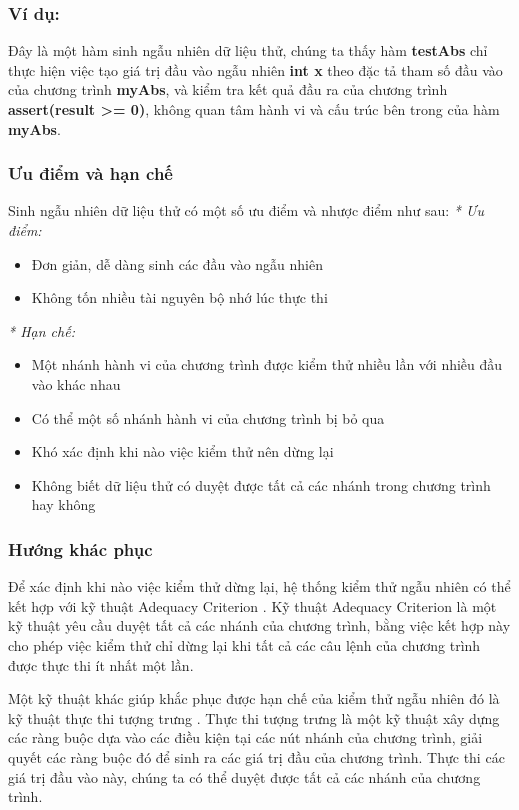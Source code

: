 \subsubsection*{Ví dụ:}

Đây là một hàm sinh ngẫu nhiên dữ liệu thử, chúng ta thấy hàm \textbf{testAbs} chỉ thực hiện việc tạo giá trị đầu vào ngẫu nhiên \textbf{int x} theo đặc tả tham số đầu vào của chương trình \textbf{myAbs}, và kiểm tra kết quả đầu ra của chương trình \textbf{assert(result >= 0)}, không quan tâm hành vi và cấu trúc bên trong của hàm \textbf{myAbs}.

\subsubsection*{Ưu điểm và hạn chế}
Sinh ngẫu nhiên dữ liệu thử có một số ưu điểm và nhược điểm như sau:
\textit{* Ưu điểm:}
\begin{itemize}
	\item Đơn giản, dễ dàng sinh các đầu vào ngẫu nhiên
	\item Không tốn nhiều tài nguyên bộ nhớ lúc thực thi
\end{itemize}

\textit{* Hạn chế:}
\begin{itemize}
	\item Một nhánh hành vi của chương trình được kiểm thử nhiều lần với nhiều đầu vào khác nhau
	\item Có thể một số nhánh hành vi của chương trình bị bỏ qua
	\item Khó xác định khi nào việc kiểm thử nên dừng lại
	\item Không biết dữ liệu thử có duyệt được tất cả các nhánh trong chương trình hay không
\end{itemize}

\subsubsection*{Hướng khác phục}
Để xác định khi nào việc kiểm thử dừng lại, hệ thống kiểm thử ngẫu nhiên có thể kết hợp với kỹ thuật Adequacy Criterion \cite{zhu1997software}. Kỹ thuật Adequacy Criterion là một kỹ thuật yêu cầu duyệt tất cả các nhánh của chương trình, bằng việc kết hợp này cho phép việc kiểm thử chỉ dừng lại khi tất cả các câu lệnh của chương trình được thực thi ít nhất một lần.

Một kỹ thuật khác giúp khắc phục được hạn chế của kiểm thử ngẫu nhiên đó là kỹ thuật thực thi tượng trưng \cite{king1976symbolic}. Thực thi tượng trưng là một kỹ thuật xây dựng các ràng buộc dựa vào các điều kiện tại các nút nhánh của chương trình, giải quyết các ràng buộc đó để sinh ra các giá trị  đầu của chương trình. Thực thi các giá trị đầu vào này, chúng ta có thể duyệt được tất cả các nhánh của chương trình. 

